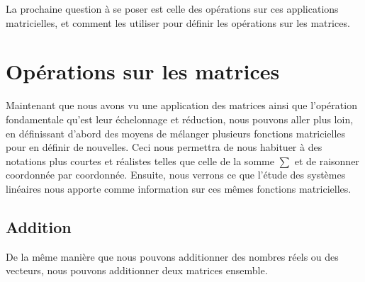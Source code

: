 La prochaine question à se poser est celle des opérations sur ces applications matricielles, et comment les utiliser pour définir les opérations sur les matrices. 


\section{Opérations sur les matrices}

\noindent Maintenant que nous avons vu une application des matrices ainsi que l'opération fondamentale qu'est leur échelonnage et réduction, nous pouvons aller plus loin, en définissant d'abord des moyens de mélanger plusieurs fonctions matricielles pour en définir de nouvelles. Ceci nous permettra de nous habituer à des notations plus courtes et réalistes telles que celle de la somme $\sum$ et de raisonner coordonnée par coordonnée. Ensuite, nous verrons ce que l'étude des systèmes linéaires nous apporte comme information sur ces mêmes fonctions matricielles.

\subsection{Addition}
\noindent De la même manière que nous pouvons additionner des nombres réels ou des vecteurs, nous pouvons additionner deux matrices ensemble. \\

